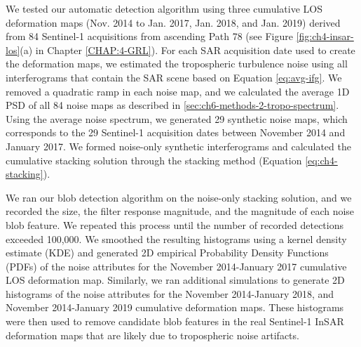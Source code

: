 

We tested our automatic detection algorithm using three cumulative LOS deformation maps (Nov. 2014 to Jan. 2017, Jan. 2018, and Jan. 2019) derived from 84 Sentinel-1 acquisitions from ascending Path 78 (see Figure \ref{fig:ch4-insar-los}(a) in Chapter \ref{CHAP:4-GRL}).
For each SAR acquisition date used to create the deformation maps, we estimated the tropospheric turbulence noise using all interferograms that contain the SAR scene based on Equation \eqref{eq:avg-ifg}. We removed a quadratic ramp in each noise map, and we calculated the average 1D PSD of all 84 noise maps as described in \ref{sec:ch6-methods-2-tropo-spectrum}.
Using the average noise spectrum, we generated 29 synthetic noise maps, which corresponds to the 29 Sentinel-1 acquisition dates between November 2014 and January 2017. We formed noise-only synthetic interferograms and calculated the cumulative stacking solution through the stacking method (Equation \eqref{eq:ch4-stacking}). 

We ran our blob detection algorithm on the noise-only stacking solution, and we recorded the size, the filter response magnitude, and the magnitude of each noise blob feature. We repeated this process until the number of recorded detections exceeded 100,000. We smoothed the resulting histograms using a kernel density estimate (KDE) \citep{Scott2015MultivariateDensityEstimation} and generated 2D empirical Probability Density Functions (PDFs) of the noise attributes for the November 2014-January 2017 cumulative LOS deformation map.
Similarly, we ran additional simulations to generate 2D histograms of the noise attributes for the November 2014-January 2018, and November 2014-January 2019 cumulative deformation maps. These histograms were then used to remove candidate blob features in the real Sentinel-1 InSAR deformation maps that are likely due to tropospheric noise artifacts.

